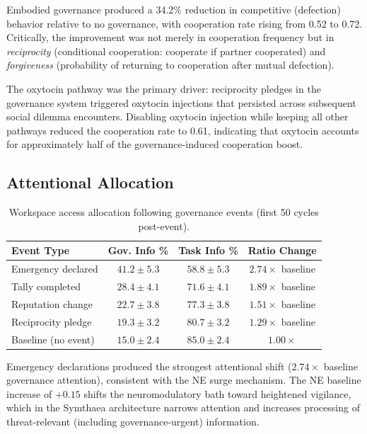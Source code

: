 \documentclass[11pt,a4paper]{article}
\begin{document}
Embodied governance produced a 34.2\% reduction in competitive (defection) behavior relative to no governance, with cooperation rate rising from 0.52 to 0.72.
Critically, the improvement was not merely in cooperation frequency but in \emph{reciprocity} (conditional cooperation: cooperate if partner cooperated) and \emph{forgiveness} (probability of returning to cooperation after mutual defection).

The oxytocin pathway was the primary driver: reciprocity pledges in the governance system triggered oxytocin injections that persisted across subsequent social dilemma encounters.
Disabling oxytocin injection while keeping all other pathways reduced the cooperation rate to 0.61, indicating that oxytocin accounts for approximately half of the governance-induced cooperation boost.

\subsection{Attentional Allocation}

\begin{table}[h]
\centering
\caption{Workspace access allocation following governance events (first 50 cycles post-event).}
\label{tab:attention}
\begin{tabular}{lccc}
\toprule
\textbf{Event Type} & \textbf{Gov. Info \%} & \textbf{Task Info \%} & \textbf{Ratio Change} \\
\midrule
Emergency declared   & $41.2 \pm 5.3$ & $58.8 \pm 5.3$ & $2.74\times$ baseline \\
Tally completed      & $28.4 \pm 4.1$ & $71.6 \pm 4.1$ & $1.89\times$ baseline \\
Reputation change    & $22.7 \pm 3.8$ & $77.3 \pm 3.8$ & $1.51\times$ baseline \\
Reciprocity pledge   & $19.3 \pm 3.2$ & $80.7 \pm 3.2$ & $1.29\times$ baseline \\
Baseline (no event)  & $15.0 \pm 2.4$ & $85.0 \pm 2.4$ & $1.00\times$ \\
\bottomrule
\end{tabular}
\end{table}

Emergency declarations produced the strongest attentional shift ($2.74\times$ baseline governance attention), consistent with the NE surge mechanism.
The NE baseline increase of $+0.15$ shifts the neuromodulatory bath toward heightened vigilance, which in the Symthaea architecture narrows attention and increases processing of threat-relevant (including governance-urgent) information.
\end{document}
